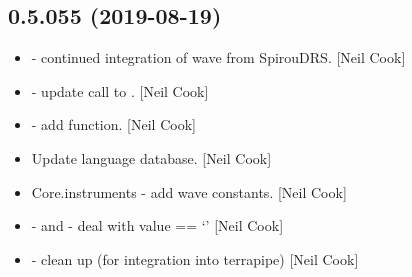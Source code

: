 \documentclass[a4paper,10pt,english]{report}
\begin{document}
\subsection{0.5.055 (2019-08-19)}
\label{\detokenize{misc/changelog:id87}}\begin{itemize}
\item {} 
 - continued integration of wave from SpirouDRS.
{[}Neil Cook{]}

\item {} 
 - update call to . {[}Neil Cook{]}

\item {} 
 - add  function. {[}Neil Cook{]}

\item {} 
Update language database. {[}Neil Cook{]}

\item {} 
Core.instruments - add wave constants. {[}Neil Cook{]}

\item {} 
 -  and
 - deal with value == ‘’ {[}Neil Cook{]}

\item {} 
 - clean up (for integration into terrapipe) {[}Neil Cook{]}

\end{itemize}
\end{document}
